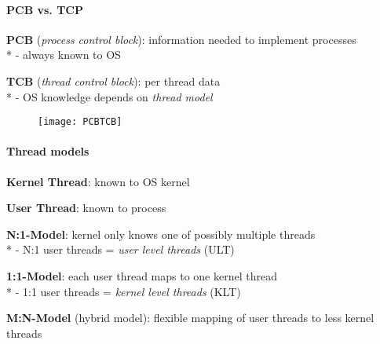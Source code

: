 \paragraph{PCB vs. TCP}
\begin{items}
  \item \textbf{PCB} (\emph{process control block}): information needed to implement processes \\*
    - always known to OS
  \item \textbf{TCB} (\emph{thread control block}): per thread data \\*
    - OS knowledge depends on \emph{thread model}
\end{items}
\begin{figure}[H]\centering\label{PCBTCB}\texttt{[image: PCBTCB]}\end{figure}

\paragraph{Thread models}
\begin{items}
  \item \textbf{Kernel Thread}: known to OS kernel
  \item \textbf{User Thread}: known to process
  \item \textbf{N:1-Model}: kernel only knows one of possibly multiple threads \\*
    - N:1 user threads = \emph{user level threads} (ULT)
  \item \textbf{1:1-Model}: each user thread maps to one kernel thread \\*
    - 1:1 user threads = \emph{kernel level threads} (KLT)
  \item \textbf{M:N-Model} (hybrid model): flexible mapping of user threads to less kernel threads 
\end{items}


